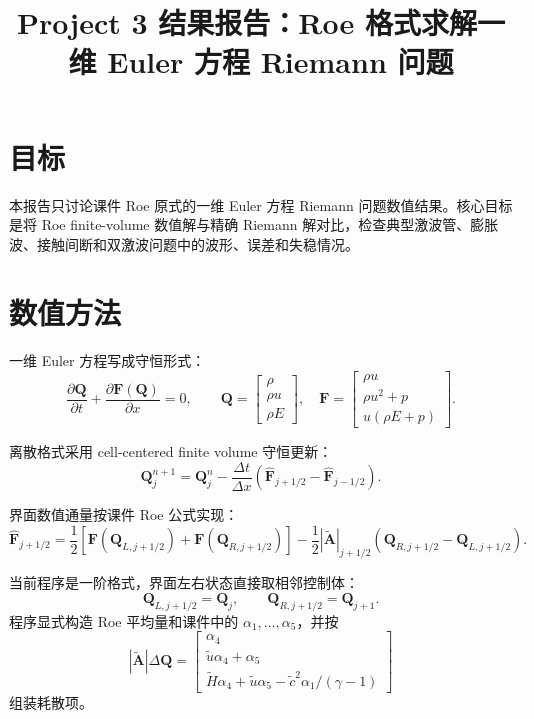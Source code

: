 \documentclass[UTF8,a4paper,11pt]{ctexart}
\title{Project 3 结果报告：Roe 格式求解一维 Euler 方程 Riemann 问题}
\author{}
\date{}
\begin{document}
\maketitle

\section{目标}

本报告只讨论课件 Roe 原式的一维 Euler 方程 Riemann 问题数值结果。核心目标是将 Roe finite-volume 数值解与精确 Riemann 解对比，检查典型激波管、膨胀波、接触间断和双激波问题中的波形、误差和失稳情况。

\section{数值方法}

一维 Euler 方程写成守恒形式：
\begin{equation}
    \frac{\partial \bm Q}{\partial t}
    +
    \frac{\partial \bm F(\bm Q)}{\partial x}
    =0,
    \qquad
    \bm Q=
    \begin{bmatrix}
        \rho\\ \rho u\\ \rho E
    \end{bmatrix},
    \quad
    \bm F=
    \begin{bmatrix}
        \rho u\\ \rho u^2+p\\ u(\rho E+p)
    \end{bmatrix}.
\end{equation}

离散格式采用 cell-centered finite volume 守恒更新：
\begin{equation}
    \bm Q_j^{n+1}
    =
    \bm Q_j^n
    -
    \frac{\Delta t}{\Delta x}
    \left(
        \hat{\bm F}_{j+1/2}
        -
        \hat{\bm F}_{j-1/2}
    \right).
\end{equation}

界面数值通量按课件 Roe 公式实现：
\begin{equation}
    \hat{\bm F}_{j+1/2}
    =
    \frac12
    \left[
        \bm F(\bm Q_{L,j+1/2})
        +
        \bm F(\bm Q_{R,j+1/2})
    \right]
    -
    \frac12
    |\tilde{\bm A}|_{j+1/2}
    \left(
        \bm Q_{R,j+1/2}
        -
        \bm Q_{L,j+1/2}
    \right).
\end{equation}

当前程序是一阶格式，界面左右状态直接取相邻控制体：
\begin{equation}
    \bm Q_{L,j+1/2}=\bm Q_j,
    \qquad
    \bm Q_{R,j+1/2}=\bm Q_{j+1}.
\end{equation}
程序显式构造 Roe 平均量和课件中的 \(\alpha_1,\ldots,\alpha_5\)，并按
\begin{equation}
    |\tilde{\bm A}|\Delta \bm Q
    =
    \begin{bmatrix}
        \alpha_4\\
        \tilde u\alpha_4+\alpha_5\\
        \tilde H\alpha_4+\tilde u\alpha_5
        -\tilde c^2\alpha_1/(\gamma-1)
    \end{bmatrix}
\end{equation}
组装耗散项。
\end{document}
